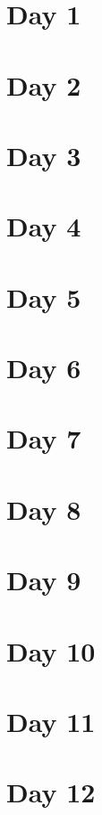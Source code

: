 \documentclass{fisattraining}
\begin{document}
\section{Day 1}

\section{Day 2}

\section{Day 3}

\section{Day 4}

\section{Day 5}

\section{Day 6}

\section{Day 7}

\section{Day 8}

\section{Day 9}

\section{Day 10}

\section{Day 11}

\section{Day 12}
\end{document}
